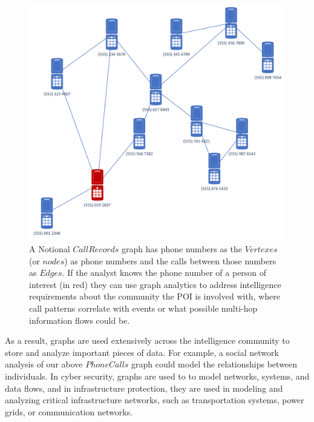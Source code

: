 \documentclass[letterpaper, 10pt]{article}
\begin{document}
\begin{multicols}{2}
        \begin{figure}
            \centering
            \includegraphics[width=\columnwidth]{Papers/ARLIS_MPR_MN/Figures/PhoneRecords.png}
            \caption{A Notional $CallRecords$ graph has phone numbers as the $Vertexes$ (or $nodes$) as phone numbers and the calls between those numbers as $Edges$. If the analyst knows the phone number of a person of interest (in red) they can use graph analytics to address intelligence requirements about the community the POI is involved with, where call patterns correlate with events or what possible multi-hop information flows could be.}
            \label{fig:callRecords}
        \end{figure}
        
        As a result, graphs are used extensively across the intelligence community to store and analyze important pieces of data. For example, a social network analysis of our above $PhoneCalls$ graph could model the relationships between individuals. In cyber security, graphs are used to to model networks, systems, and data flows, and in infrastructure protection, they are used in modeling and analyzing critical infrastructure networks, such as transportation systems, power grids, or communication networks. 


\end{multicols}
\end{document}
